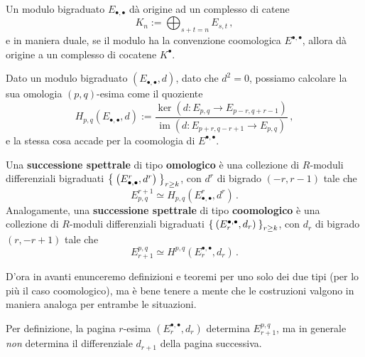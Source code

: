 \begin{oss}
	Un modulo bigraduato $E_{\bullet,\bullet}$ dà origine ad un complesso di catene
	\begin{equation*}
		K_{n} := \bigoplus_{s+t=n} E_{s,t}\,,
	\end{equation*}
	e in maniera duale, se il modulo ha la convenzione coomologica $E^{\bullet, \bullet}$,
	allora dà origine a un complesso di cocatene $K^{\bullet}$.
\end{oss}

Dato un modulo bigraduato $(E_{\bullet,\bullet},d)$, 
dato che $d^{2}=0$, possiamo calcolare la sua omologia $(p,q)$-esima 
come il quoziente
\begin{equation*}
	H_{p,q}(E_{\bullet,\bullet},d) := \dfrac{\ker\left( d : E_{p,q} \to E_{p-r,q+r-1} \right)}{\operatorname{im}\left( d: E_{p+r,q-r+1} \to E_{p,q} \right)}\,,
\end{equation*}
e la stessa cosa accade per la coomologia di $E^{\bullet,\bullet}$. 

\begin{df}
	Una \textbf{successione spettrale} di tipo \textbf{omologico}
	è una collezione di $R$-moduli differenziali bigraduati 
	$\Set{ \left(E^{r}_{\bullet,\bullet},d^{r}\right)}_{r \ge k}$,
	con $d^{r}$ di bigrado $(-r,r-1)$ tale che 
	\begin{equation*}
		E^{r+1}_{p,q} \simeq H_{p,q} \left( E_{\bullet,\bullet}^{r}, d^{r} \right)\,.
	\end{equation*}
	Analogamente, una \textbf{successione spettrale} di tipo \textbf{coomologico}
	è una collezione di $R$-moduli differenziali bigraduati 
	$\Set{ \left(E_{r}^{\bullet,\bullet},d_{r}\right)}_{r \ge k}$,
	con $d_{r}$ di bigrado $(r,-r+1)$ tale che 
	\begin{equation*}
		E_{r+1}^{p,q} \simeq H^{p,q} \left( E^{\bullet,\bullet}_{r}, d_{r} \right)\,.
	\end{equation*}
\end{df}

D'ora in avanti enunceremo definizioni e teoremi per uno solo dei due tipi
(per lo più il caso coomologico), ma è bene tenere a mente che
le costruzioni valgono in maniera analoga per entrambe le situazioni.

\begin{oss}
	Per definizione, la pagina $r$-esima $(E_{r}^{\bullet,\bullet},d_{r})$
	determina $E_{r+1}^{p,q}$, ma in generale
	\emph{non} determina il differenziale $d_{r+1}$ della pagina successiva.
\end{oss}

